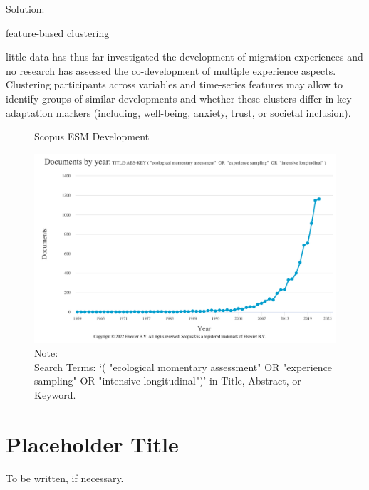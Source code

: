 \documentclass[man, 12pt, a4paper]{apa7}
\theoremstyle{break}
\theoremstyle{plain}
\begin{document}
Solution:   

feature-based clustering

little data has thus far investigated the development of migration experiences and no research has assessed the co-development of multiple experience aspects. Clustering participants across variables and time-series features may allow to identify groups of similar developments and whether these clusters differ in key adaptation markers (including, well-being, anxiety, trust, or societal inclusion).




%



\begin{figure}
  \caption{Scopus ESM Development}
  \label{fig:ScopusEsm}
  \centering\includegraphics[width=\textwidth]{figures/Scopus-ESM-Development.png}
  \caption*{Note: \\
  Search Terms: `( "ecological momentary assessment"  OR  "experience sampling"  OR  "intensive longitudinal")' in Title, Abstract, or Keyword.}
\end{figure}

\printbibliography

\appendix

\section{Placeholder Title}
\label{app:AppendixTitle}
To be written, if necessary.
\end{document}
